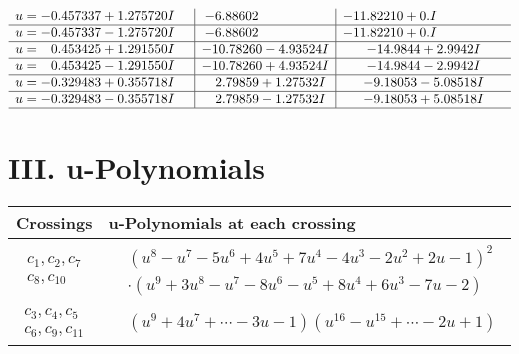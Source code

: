 \documentclass[1p]{elsarticle_modified}
\theoremstyle{definition}
\begin{document}
$$\begin{array}{c|c|c}
\begin{aligned}
u &= -0.457337 + 1.275720 I\end{aligned}
 & -6.88602\phantom{ +0.000000I} & -11.82210 + 0. I\phantom{ +0.000000I} \\ \hline\begin{aligned}
u &= -0.457337 - 1.275720 I\end{aligned}
 & -6.88602\phantom{ +0.000000I} & -11.82210 + 0. I\phantom{ +0.000000I} \\ \hline\begin{aligned}
u &= \phantom{-}0.453425 + 1.291550 I\end{aligned}
 & -10.78260 - 4.93524 I & -14.9844 + 2.9942 I \\ \hline\begin{aligned}
u &= \phantom{-}0.453425 - 1.291550 I\end{aligned}
 & -10.78260 + 4.93524 I & -14.9844 - 2.9942 I \\ \hline\begin{aligned}
u &= -0.329483 + 0.355718 I\end{aligned}
 & \phantom{-}2.79859 + 1.27532 I & -9.18053 - 5.08518 I \\ \hline\begin{aligned}
u &= -0.329483 - 0.355718 I\end{aligned}
 & \phantom{-}2.79859 - 1.27532 I & -9.18053 + 5.08518 I\\
 \hline 
 \end{array}$$\newpage
\newpage\renewcommand{\arraystretch}{1}
\centering \section*{ III. u-Polynomials}
\begin{tabular}{m{50pt}|m{274pt}}
Crossings & \hspace{64pt}u-Polynomials at each crossing \\
\hline $$\begin{aligned}c_{1},c_{2},c_{7}\\c_{8},c_{10}\end{aligned}$$&$\begin{aligned}
&(u^8- u^7-5 u^6+4 u^5+7 u^4-4 u^3-2 u^2+2 u-1)^2\\
&\cdot(u^9+3 u^8- u^7-8 u^6- u^5+8 u^4+6 u^3-7 u-2)
\end{aligned}$\\
\hline $$\begin{aligned}c_{3},c_{4},c_{5}\\c_{6},c_{9},c_{11}\end{aligned}$$&$\begin{aligned}
&(u^9+4 u^7+\cdots-3 u-1)(u^{16}- u^{15}+\cdots-2 u+1)
\end{aligned}$\\
\hline
\end{tabular}\newpage\renewcommand{\arraystretch}{1}
\end{document}
